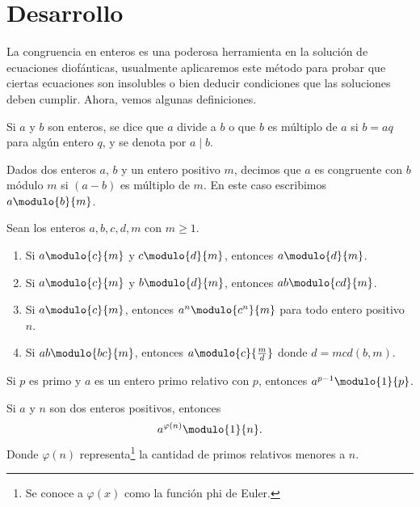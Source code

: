 \section{Desarrollo}

La congruencia en enteros es una poderosa herramienta en la solución de ecuaciones diofánticas, usualmente aplicaremos
este método para probar que ciertas ecuaciones son insolubles o bien deducir condiciones que las soluciones deben cumplir.
Ahora, vemos algunas definiciones.

\begin{definition}[Divisibilidad]
    Si $a$ y $b$ son enteros, se dice que $a$ divide a $b$ o que $b$ es múltiplo de $a$ si $b = aq$ para algún entero $q$,
    y se denota por $a \mid b$.
\end{definition}

\begin{definition}[Congruencias]
    Dados dos enteros $a$, $b$ y un entero positivo $m$, decimos que $a$ es congruente con $b$ módulo $m$ si $(a - b)$ es múltiplo de $m$.
    En este caso escribimos $a \modulo{b}{m}$.
\end{definition}

\begin{theorem}
    Sean los enteros $a,b,c,d,m$ con $m \geq 1$.
    \begin{enumerate}
        \item Si $a \modulo{c}{m}$ y $c \modulo{d}{m}$, entonces $a \modulo{d}{m}$.
        \item Si $a \modulo{c}{m}$ y $b \modulo{d}{m}$, entonces $ab \modulo{cd}{m}$.
        \item Si $a \modulo{c}{m}$, entonces $a^n \modulo{c^n}{m}$ para todo entero positivo $n$.
        \item Si $ab \modulo{bc}{m}$, entonces $a \modulo{c}{\frac{m}{d}}$ donde $d = mcd(b,m)$.
    \end{enumerate}
\end{theorem}

\begin{theorem}
    Si $p$ es primo y $a$ es un entero primo relativo con $p$, entonces $a^{p - 1} \modulo{1}{p}$.
\end{theorem}

\begin{theorem}
    Si $a$ y $n$ son dos enteros positivos, entonces
    \[
        a^{\varphi(n)} \modulo{1}{n}.
    \]
    Donde $\varphi(n)$ representa\footnote{Se conoce a $\varphi(x)$ como la función phi de Euler.} la cantidad de primos relativos menores a $n$.
\end{theorem}

